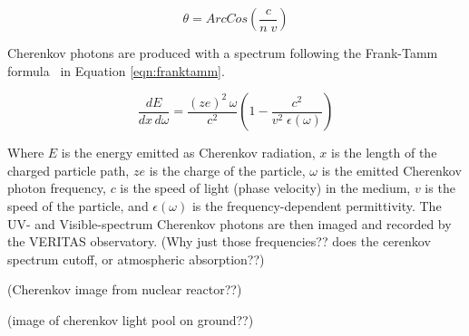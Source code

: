   \begin{equation}\label{eqn:cherenkovangle}
    \theta = ArcCos \left ( \frac{c}{n \; v} \right )
  \end{equation}
  
  Cherenkov photons are produced with a spectrum following the Frank-Tamm formula~\cite{franktamm1,franktamm2} in Equation \ref{eqn:franktamm}.
  
  \begin{equation}\label{eqn:franktamm}
    \frac{dE}{dx\,d\omega}=\frac{(ze)^2 \, \omega}{c^2} \left ( 1 - \frac{c^2}{v^2 \;\epsilon(\omega)} \right )
  \end{equation}
  
  Where $E$ is the energy emitted as Cherenkov radiation, $x$ is the length of the charged particle path, $ze$ is the charge of the particle, $\omega$ is the emitted Cherenkov photon frequency, $c$ is the speed of light (phase velocity) in the medium, $v$ is the speed of the particle, and $\epsilon(\omega)$ is the frequency-dependent permittivity.
  The UV- and Visible-spectrum Cherenkov photons are then imaged and recorded by the VERITAS observatory.
  {\color{red}(Why just those frequencies?? does the cerenkov spectrum cutoff, or atmospheric absorption??)}
  
  {\color{red}(Cherenkov image from nuclear reactor??)}
  
  {\color{red}(image of cherenkov light pool on ground??)}
  

